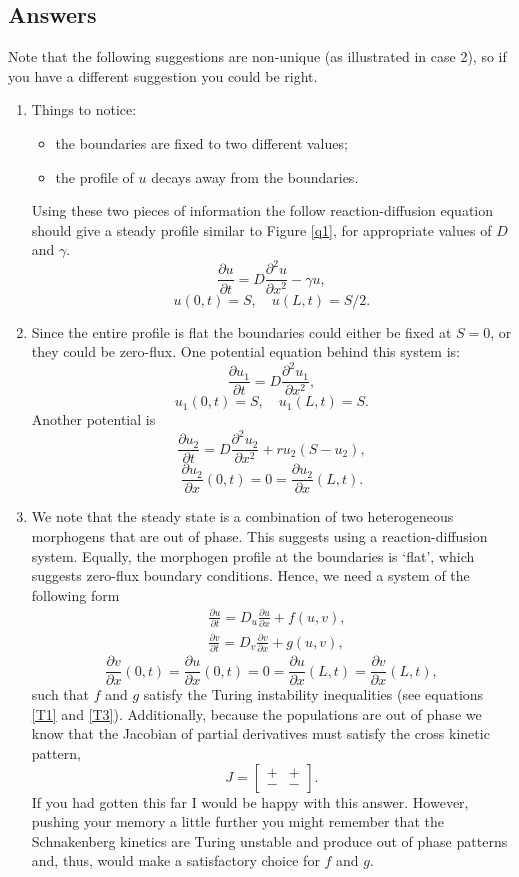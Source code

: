 \documentclass[10pt]{article}
\newcommand{\bb}{\begin{equation}}
\newcommand{\ee}{\end{equation}}
\newcommand{\D}[2]{\frac{\partial #1}{\partial #2}}
\newcommand{\DD}[2]{\frac{\partial^2 #1}{\partial #2^2}}
\newcommand{\fig}[1]{Figure \ref{#1}}
\newcommand{\eqns}[2]{equations \eqref{#1} and \eqref{#2}}
\begin{document}
\begin{Answ}
\subsection{Answers}
Note that the following suggestions are non-unique (as illustrated in case 2), so if you have a different suggestion you could be right.
\begin{enumerate}
\item Things to notice:
\begin{itemize}
\item the boundaries are fixed to two different values;
\item the profile of $u$ decays away from the boundaries.
\end{itemize}
Using these two pieces of information the follow reaction-diffusion equation should give a steady profile similar to \fig{q1}, for appropriate values of $D$ and $\gamma$.
\bb
\D{u}{t}=D\DD{u}{x}-\gamma u,
\ee
\bb
u(0,t)=S, \quad u(L,t)=S/2.
\ee

\item Since the entire profile is flat the boundaries could either be fixed at $S=0$, or they could be zero-flux. One potential equation behind this system is:
\bb
\D{u_1}{t}=D\DD{u_1}{x},
\ee
\bb
u_1(0,t)=S, \quad u_1(L,t)=S.
\ee
Another potential is
\bb
\D{u_2}{t}=D\DD{u_2}{x}+ru_2(S-u_2),
\ee
\bb
\D{u_2}{x}(0,t)=0=\D{u_2}{x}(L,t).
\ee

\item We note that the steady state is a combination of two heterogeneous morphogens that are out of phase. This suggests using a reaction-diffusion system. Equally, the morphogen profile at the boundaries is `flat', which suggests zero-flux boundary conditions. Hence, we need a system of the following form
\begin{align}
&\D{u}{t}=D_u\D{u}{x}+f(u,v),\\
&\D{v}{t}=D_v\D{v}{x}+g(u,v),
\end{align}
\bb
\D{v}{x}(0,t)=\D{u}{x}(0,t)=0=\D{u}{x}(L,t)=\D{v}{x}(L,t),
\ee
such that $f$ and $g$ satisfy the Turing instability inequalities (see \eqns{T1}{T3}). Additionally, because the populations are out of phase we know that the Jacobian of partial derivatives must satisfy the cross kinetic pattern,
\bb
J=\left[ \begin {array}{cc} + & + \\ - & -\end {array} \right].
\ee
If you had gotten this far I would be happy with this answer. However, pushing your memory a little further you might remember that the Schnakenberg kinetics are Turing unstable and produce out of phase patterns and, thus, would make a satisfactory choice for $f$ and $g$.
\end{enumerate}

\end{Answ}
\end{document}
